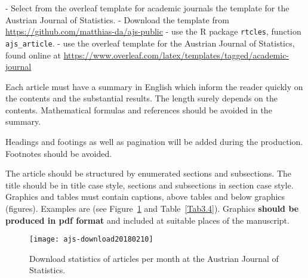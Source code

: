 \documentclass[article]{ajs}
\begin{document}
- Select from the overleaf template for academic journals the template for the Austrian Journal of Statistics.
- Download the template from \href{https://github.com/matthias-da/ajs-public}{https://github.com/matthias-da/ajs-public}
- use the R package \texttt{rtcles}, function \texttt{ajs\_article}.
- use the overleaf template for the Austrian Journal of Statistics, found online at \href{https://www.overleaf.com/latex/templates/tagged/academic-journal}{https://www.overleaf.com/latex/templates/tagged/academic-journal}



Each article must have a summary in English which
inform the reader quickly on the contents and the substantial
results. The length surely depends on the contents. 
Mathematical formulas and references should be
avoided in the summary.

Headings and footings as well as pagination will be added during
the production. Footnotes should be avoided.

The article should be structured by enumerated sections and
subsections. The title should be in title case style, sections and subsections in section case style. Graphics and tables must contain captions, above
tables and below graphics (figures). Examples are (see Figure~\ref{fig:Fig3.4} and Table~\ref{Tab3.4}).
Graphics \textbf{should be produced in \textbf{pdf} format} and included 
 at suitable places of the manuscript. 

\begin{figure}[hbt]
\begin{center}
\texttt{[image: ajs-download20180210]}
\caption{\label{fig:Fig3.4}Download statistics of articles per month at the Austrian Journal of Statistics.}  
\end{center}
\end{figure}
\end{document}
